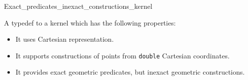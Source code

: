 \begin{ccRefClass}{Exact_predicates_inexact_constructions_kernel}

\ccDefinition
A typedef to a kernel which has the following properties:

\begin{itemize}
\item It uses Cartesian representation.
\item It supports constructions of points from \texttt{double} Cartesian
      coordinates.
\item It provides exact geometric predicates, but inexact geometric
      constructions.
\end{itemize}


\ccIsModel
{}

\ccSeeAlso
{} \\
 \\

\end{ccRefClass}
